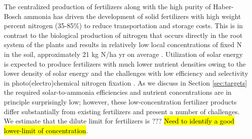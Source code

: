 The centralized production of fertilizers along with the high purity of Haber-Bosch ammonia has driven the development of solid fertilizers with high weight percent nitrogen (35-85\%) to reduce transportation and storage costs. This is in contrast to the biological production of nitrogen that occurs directly in the root system of the plants and results in relatively low local concentrations of fixed N in the soil, approximately 21 kg N/ha yr on average \cite{Smil_1999_2}.
Utilization of solar energy is expected to produce fertilizers with much lower nutrient densities owing to the lower density of solar energy \needcite and the challenges with low efficiency and selectivity in photo(electro)chemical nitrogen fixation \needcite. As we discuss in Section \ref{sec:targets} the required solar-to-ammonia efficiencies and nutrient concentrations are in principle surprisingly low; however, these low-concentration fertilizer products differ substantially from existing fertilizers and present a number of challenges. We estimate that the dilute limit for fertilizers is ??? \hl{Need to identify a good lower-limit of concentration}.
